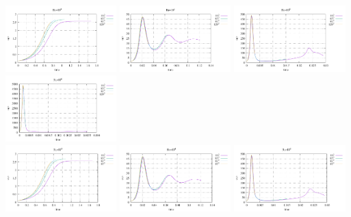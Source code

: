 \begin{center}
\\
\includegraphics[width=4.297cm]{python_codes/fieldstone_155/results/avrg_u_Ra1e3}
\includegraphics[width=4.297cm]{python_codes/fieldstone_155/results/avrg_u_Ra1e4}
\includegraphics[width=4.297cm]{python_codes/fieldstone_155/results/avrg_u_Ra1e5}
\includegraphics[width=4.297cm]{python_codes/fieldstone_155/results/avrg_u_Ra1e6}\\
\includegraphics[width=4.297cm]{python_codes/fieldstone_155/results/avrg_v_Ra1e3}
\includegraphics[width=4.297cm]{python_codes/fieldstone_155/results/avrg_v_Ra1e4}
\includegraphics[width=4.297cm]{python_codes/fieldstone_155/results/avrg_v_Ra1e5}

\end{center}
